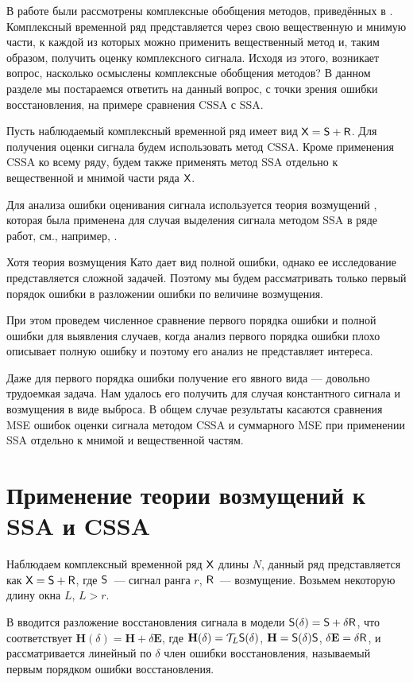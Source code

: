 \documentclass[specialist,
               substylefile = spbu.rtx,
               subf,href,colorlinks=true, 12pt]{disser}
\begin{document}
В работе были рассмотрены комплексные обобщения методов, приведённых в \cite{Tretyakova20}. Комплексный временной ряд представляется через свою вещественную и мнимую части, к каждой из которых можно применить вещественный метод и, таким образом, получить оценку комплексного сигнала. Исходя из этого, возникает вопрос, насколько осмыслены комплексные обобщения методов? В данном разделе мы постараемся ответить на данный вопрос, с точки зрения ошибки восстановления, на примере сравнения CSSA с SSA.

Пусть наблюдаемый комплексный временной ряд имеет вид $\textsf{X} =\textsf{S} + \textsf{R}$. Для получения оценки сигнала будем использовать метод CSSA. Кроме применения CSSA ко всему ряду, будем также применять метод SSA отдельно к вещественной и мнимой части ряда $\textsf{X}$.

Для анализа ошибки оценивания сигнала используется теория возмущений \cite{Kato}, которая была применена для случая выделения сигнала методом SSA в ряде работ, см., например, \cite{Nekrutkin}.

Хотя теория возмущения Като дает вид полной ошибки, однако ее исследование представляется сложной задачей. Поэтому мы будем рассматривать только первый порядок ошибки в разложении ошибки по величине возмущения.

При этом проведем численное сравнение первого порядка ошибки и полной ошибки для выявления случаев, когда анализ первого порядка ошибки плохо описывает полную ошибку и поэтому его анализ не представляет интереса.

Даже для первого порядка ошибки получение его явного вида --- довольно трудоемкая задача. Нам удалось его получить для случая константного сигнала и возмущения в виде выброса. В общем случае результаты касаются сравнения MSE ошибок оценки сигнала методом CSSA и суммарного MSE при применении SSA отдельно к мнимой и вещественной частям.


\section{Применение теории возмущений к SSA и CSSA}

Наблюдаем комплексный временной ряд $\textsf{X}$ длины $N$, данный ряд представляется как $\textsf{X} = \textsf{S} + \textsf{R}$, где $\textsf{S}$~--- сигнал ранга $r$, $\textsf{R}$~--- возмущение.  Возьмем некоторую длину окна $L$, $L>r$.

В \cite{Nekrutkin} вводится разложение восстановления сигнала в модели $\textsf{S}(\delta) = \textsf{S} + \delta \textsf{R}$, что соответствует $\mathbf{H}(\delta) = \mathbf{H} + \delta \mathbf{E}$, где $\mathbf{H}(\delta) = \mathcal{T}_L \textsf{S}(\delta)$, $\mathbf{H} = \textsf{S}(\delta)\textsf{S}$, $\delta\mathbf{E} = \delta \textsf{R}$, и рассматривается линейный по $\delta$ член ошибки восстановления, называемый первым порядком ошибки восстановления.
\end{document}
